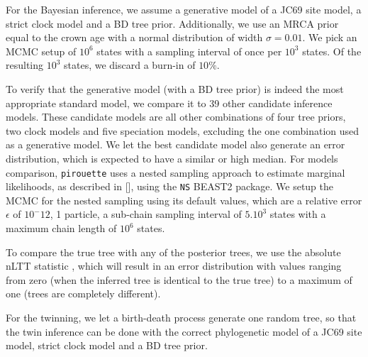 For the Bayesian inference, we assume a generative model of 
a JC69 site model, a strict clock model and a BD tree prior. 
Additionally, we use an MRCA prior equal to the crown age with a normal distribution 
of width $\sigma = 0.01$. We pick an MCMC setup of $10^6$ states
with a sampling interval of once per $10^3$ states. Of the resulting
$10^3$ states, we discard a burn-in of $10\%$.

To verify that the generative model (with a BD tree prior) is
indeed the most appropriate standard model, we compare it to
39 other candidate inference models. These candidate models 
are all other combinations of four tree priors, 
two clock models and five speciation models, 
excluding the one combination used as a generative model.
We let the best candidate model also generate an error distribution,
which is expected to have a similar or high median.
For models comparison, \verb;pirouette; uses a nested sampling approach
to estimate marginal likelihoods,
as described in [\cite{maturana2018model}], 
using the \verb;NS; BEAST2 package. We setup the MCMC for the nested sampling
using its default values, which are a relative error $\epsilon$ of $10^-12$, 
1 particle, a sub-chain sampling interval of $5.10^3$ states with
a maximum chain length of $10^6$ states.

To compare the true tree with any of the posterior trees,
we use the absolute nLTT statistic \citet{janzen2015},
which will result in an error distribution with values
ranging from zero (when the inferred tree is identical 
to the true tree) to a maximum of one (trees are completely different).

For the twinning, we let a birth-death process generate one random tree,
so that the twin inference can be done with the correct phylogenetic
model of a JC69 site model, strict clock model and a BD tree prior.
